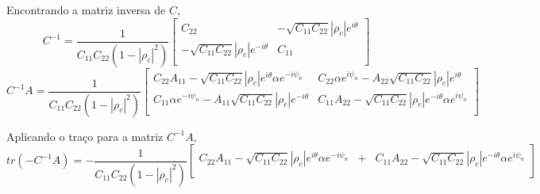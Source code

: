 \documentclass[10pt,a4paper]{article}
\begin{document}
Encontrando a matriz inversa de $C$,
\begin{equation}\label{sec1eqn44}
	C^{-1}=\frac{1}{C_{11}C_{22}(1-\left|\rho_c\right|^2)}\left[
\begin{array}{cc}
	C_{22}              & -\sqrt{C_{11}C_{22}}\left|\rho_c \right|e^{i\theta} \\
 -\sqrt{C_{11}C_{22}}\left|\rho_c \right|e^{-i\theta} & C_{11}\\
\end{array}\right]
\end{equation}
\begin{equation}\label{sec1eqn45}
	C^{-1}A=\frac{1}{C_{11}C_{22}(1-\left|\rho_c\right|^2)}\left[
\begin{array}{cc}
	C_{22}A_{11}-\sqrt{C_{11}C_{22}}\left|\rho_c \right|e^{i\theta}\alpha e^{-i\psi_n} & C_{22} \alpha e^{i\psi_n}-A_{22}\sqrt{C_{11}C_{22}}\left|\rho_c \right|e^{i\theta} \\
	C_{11}\alpha e^{-i\psi_n}-A_{11}\sqrt{C_{11}C_{22}}\left|\rho_c \right|e^{-i\theta} & C_{11}A_{22}-\sqrt{C_{11}C_{22}}\left|\rho_c \right|e^{-i\theta}\alpha e^{i\psi_n} \\
\end{array}\right]
\end{equation}

Aplicando o traço para a matriz $C^{-1}A$,
{\footnotesize
\begin{equation}\label{sec1eqn46}
	tr(-C^{-1}A)=-\frac{1}{C_{11}C_{22}(1-\left|\rho_c\right|^2)}\left[
\begin{array}{ccc}
	C_{22}A_{11}-\sqrt{C_{11}C_{22}}\left|\rho_c \right|e^{i\theta}\alpha e^{-i\psi_n} &+& C_{11}A_{22}-\sqrt{C_{11}C_{22}}\left|\rho_c \right|e^{-i\theta}\alpha e^{i\psi_n} \\
\end{array}\right]
\end{equation}}
\end{document}
